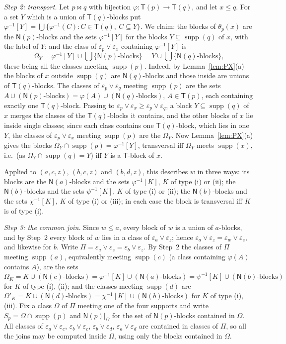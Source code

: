 \documentclass[11pt]{amsart}
\theoremstyle{definition}
\newcommand{\supp}{\operatorname{supp}}
\newcommand{\T}{\mathsf{T}}
\newcommand{\N}{\mathsf{N}}
\begin{document}
\smallskip
\emph{Step 2: transport.} Let $p\bowtie q$ with bijection $\varphi\colon\T(p)\to\T(q)$, and let $x\le q$. For a set $Y$ which is a union of $\T(q)$-blocks put $\varphi^{-1}[Y]=\bigcup\{\varphi^{-1}(C):C\in\T(q),\ C\subseteq Y\}$. We claim: the blocks of $\theta_p(x)$ are the $\N(p)$-blocks and the sets $\varphi^{-1}[Y]$ for the blocks $Y\subseteq\supp(q)$ of $x$, with the label of $Y$; and the class of $\varepsilon_p\vee\varepsilon_x$ containing $\varphi^{-1}[Y]$ is
\[
\Omega_Y=\varphi^{-1}[Y]\cup\textstyle\bigcup\{\text{$\N(p)$-blocks}\}=Y\cup\bigcup\{\text{$\N(q)$-blocks}\},
\]
these being all the classes meeting $\supp(p)$. Indeed, by Lemma~\ref{lem:PX}(a) the blocks of $x$ outside $\supp(q)$ are $\N(q)$-blocks and those inside are unions of $\T(q)$-blocks. The classes of $\varepsilon_p\vee\varepsilon_q$ meeting $\supp(p)$ are the sets $A\cup(\N(p)\text{-blocks})=\varphi(A)\cup(\N(q)\text{-blocks})$, $A\in\T(p)$, each containing exactly one $\T(q)$-block. Passing to $\varepsilon_p\vee\varepsilon_x\ge\varepsilon_p\vee\varepsilon_q$, a block $Y\subseteq\supp(q)$ of $x$ merges the classes of the $\T(q)$-blocks it contains, and the other blocks of $x$ lie inside single classes; since each class contains one $\T(q)$-block, which lies in one $Y$, the classes of $\varepsilon_p\vee\varepsilon_x$ meeting $\supp(p)$ are the $\Omega_Y$. Now Lemma~\ref{lem:PX}(a) gives the blocks $\Omega_Y\cap\supp(p)=\varphi^{-1}[Y]$, transversal iff $\Omega_Y$ meets $\supp(x)$, i.e.\ (as $\Omega_Y\cap\supp(q)=Y$) iff $Y$ is a $\T$-block of $x$.

Applied to $(a,c,z)$, $(b,c,z)$ and $(b,d,z)$, this describes $w$ in three ways: its blocks are the $\N(a)$-blocks and the sets $\varphi^{-1}[K]$, $K$ of type (i) or (ii); the $\N(b)$-blocks and the sets $\psi^{-1}[K]$, $K$ of type (i) or (ii); the $\N(b)$-blocks and the sets $\chi^{-1}[K]$, $K$ of type (i) or (iii); in each case the block is transversal iff $K$ is of type (i).

\smallskip
\emph{Step 3: the common join.} Since $w\le a$, every block of $w$ is a union of $a$-blocks, and by Step~2 every block of $w$ lies in a class of $\varepsilon_a\vee\varepsilon_z$; hence $\varepsilon_a\vee\varepsilon_z=\varepsilon_w\vee\varepsilon_z$, and likewise for $b$. Write $\Pi=\varepsilon_a\vee\varepsilon_z=\varepsilon_b\vee\varepsilon_z$. By Step~2 the classes of $\Pi$ meeting $\supp(a)$, equivalently meeting $\supp(c)$ (a class containing $\varphi(A)$ contains $A$), are the sets $\Omega_K=K\cup(\N(c)\text{-blocks})=\varphi^{-1}[K]\cup(\N(a)\text{-blocks})=\psi^{-1}[K]\cup(\N(b)\text{-blocks})$ for $K$ of type (i), (ii); and the classes meeting $\supp(d)$ are $\Omega'_K=K\cup(\N(d)\text{-blocks})=\chi^{-1}[K]\cup(\N(b)\text{-blocks})$ for $K$ of type (i), (iii). Fix a class $\Omega$ of $\Pi$ meeting one of the four supports and write $S_p=\Omega\cap\supp(p)$ and $\N(p)|_\Omega$ for the set of $\N(p)$-blocks contained in $\Omega$. All classes of $\varepsilon_a\vee\varepsilon_c$, $\varepsilon_b\vee\varepsilon_c$, $\varepsilon_b\vee\varepsilon_d$, $\varepsilon_a\vee\varepsilon_d$ are contained in classes of $\Pi$, so all the joins may be computed inside $\Omega$, using only the blocks contained in $\Omega$.
\end{document}
